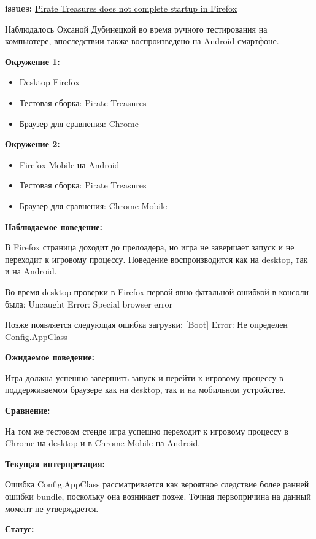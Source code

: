 \documentclass{ZGJournalArticle_2026}
\providecommand{\tightlist}{%
  \setlength{\itemsep}{0pt}\setlength{\parskip}{0pt}}
\begin{document}
\textbf{issues:}
\href{https://github.com/Dubinetsky/tapclap/issues/1}{Pirate Treasures
does not complete startup in Firefox}

Наблюдалось Оксаной Дубинецкой во время ручного тестирования на
компьютере, впоследствии также воспроизведено на Android-смартфоне.

\textbf{Окружение 1:}

\begin{itemize}
\tightlist
\item
  Desktop Firefox
\item
  Тестовая сборка: Pirate Treasures
\item
  Браузер для сравнения: Chrome
\end{itemize}

\textbf{Окружение 2:}

\begin{itemize}
\tightlist
\item
  Firefox Mobile на Android
\item
  Тестовая сборка: Pirate Treasures
\item
  Браузер для сравнения: Chrome Mobile
\end{itemize}

\textbf{Наблюдаемое поведение:}

В Firefox страница доходит до прелоадера, но игра не завершает запуск и
не переходит к игровому процессу. Поведение воспроизводится как на
desktop, так и на Android.

Во время desktop-проверки в Firefox первой явно фатальной ошибкой в
консоли была: Uncaught Error: Special browser error

Позже появляется следующая ошибка загрузки: {[}Boot{]} Error: Не
определен Config.AppClass

\textbf{Ожидаемое поведение:}

Игра должна успешно завершить запуск и перейти к игровому процессу в
поддерживаемом браузере как на desktop, так и на мобильном устройстве.

\textbf{Сравнение:}

На том же тестовом стенде игра успешно переходит к игровому процессу в
Chrome на desktop и в Chrome Mobile на Android.

\textbf{Текущая интерпретация:}

Ошибка Config.AppClass рассматривается как вероятное следствие более
ранней ошибки bundle, поскольку она возникает позже. Точная первопричина
на данный момент не утверждается.

\textbf{Статус:}
\end{document}
